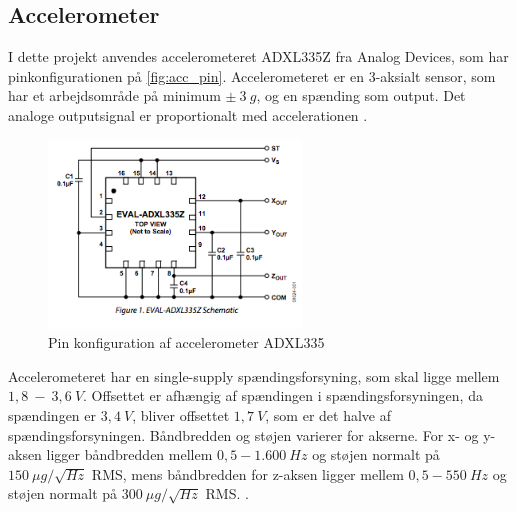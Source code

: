 \subsection{Accelerometer} \label{sec:acc}

I dette projekt anvendes accelerometeret ADXL335Z fra Analog Devices, som har pinkonfigurationen på \autoref{fig:acc_pin}. Accelerometeret er en 3-aksialt sensor, som har et arbejdsområde på minimum $\pm~3~g$, og en spænding som output. Det analoge outputsignal er proportionalt med accelerationen \citep{analogdevices2009}. 

\begin{figure}[H]
\centering
\includegraphics[width=0.6\textwidth]{figures/acc_pin.png}
\caption{Pin konfiguration af accelerometer ADXL335 \citep{analogdevices2009}}
\label{fig:acc_pin}
\end{figure}

\noindent
Accelerometeret har en single-supply spændingsforsyning, som skal ligge mellem $1,8~-~3,6~V$.  Offsettet er afhængig af spændingen i spændingsforsyningen, da spændingen er $3,4~V$, bliver offsettet $1,7~V$, som er det halve af spændingsforsyningen. Båndbredden og støjen varierer for akserne. For x- og y-aksen ligger båndbredden mellem $0,5 - 1.600~Hz$ og støjen normalt på $150~\mu g/\sqrt{Hz}$ RMS, mens båndbredden for z-aksen ligger mellem $0,5 - 550~Hz$ og støjen normalt på $300~\mu g/\sqrt{Hz}$ RMS.  \citep{analogdevices2010}. 

